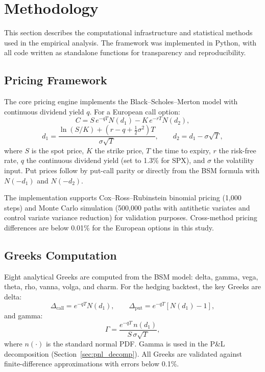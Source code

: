 \documentclass[12pt, letterpaper]{article}
\begin{document}
\section{Methodology}
\label{sec:methodology}

This section describes the computational infrastructure and statistical methods used in the empirical analysis. The framework was implemented in Python, with all code written as standalone functions for transparency and reproducibility.

\subsection{Pricing Framework}
\label{sec:pricing}

The core pricing engine implements the Black--Scholes--Merton model with continuous dividend yield $q$. For a European call option:
\begin{equation}
    C = S \, e^{-qT} N(d_1) - K \, e^{-rT} N(d_2),
    \label{eq:bs_call}
\end{equation}
\begin{equation}
    d_1 = \frac{\ln(S/K) + (r - q + \tfrac{1}{2}\sigma^2)T}{\sigma\sqrt{T}}, \qquad d_2 = d_1 - \sigma\sqrt{T},
    \label{eq:d1d2}
\end{equation}
where $S$ is the spot price, $K$ the strike price, $T$ the time to expiry, $r$ the risk-free rate, $q$ the continuous dividend yield (set to 1.3\% for SPX), and $\sigma$ the volatility input. Put prices follow by put-call parity or directly from the BSM formula with $N(-d_1)$ and $N(-d_2)$.

The implementation supports Cox--Ross--Rubinstein binomial pricing (1,000 steps) and Monte Carlo simulation (500,000 paths with antithetic variates and control variate variance reduction) for validation purposes. Cross-method pricing differences are below 0.01\% for the European options in this study.

\subsection{Greeks Computation}
\label{sec:greeks}

Eight analytical Greeks are computed from the BSM model: delta, gamma, vega, theta, rho, vanna, volga, and charm. For the hedging backtest, the key Greeks are delta:
\begin{equation}
    \Delta_{\text{call}} = e^{-qT} N(d_1), \qquad \Delta_{\text{put}} = e^{-qT}[N(d_1) - 1],
    \label{eq:delta}
\end{equation}
and gamma:
\begin{equation}
    \Gamma = \frac{e^{-qT}\, n(d_1)}{S \, \sigma \sqrt{T}},
    \label{eq:gamma}
\end{equation}
where $n(\cdot)$ is the standard normal PDF. Gamma is used in the P\&L decomposition (Section~\ref{sec:pnl_decomp}). All Greeks are validated against finite-difference approximations with errors below 0.1\%.
\end{document}
